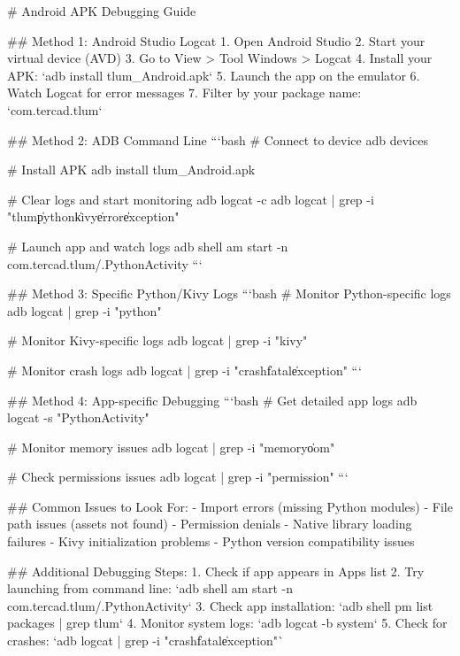 # Android APK Debugging Guide

## Method 1: Android Studio Logcat
1. Open Android Studio
2. Start your virtual device (AVD)
3. Go to View > Tool Windows > Logcat
4. Install your APK: `adb install tlum_Android.apk`
5. Launch the app on the emulator
6. Watch Logcat for error messages
7. Filter by your package name: `com.tercad.tlum`

## Method 2: ADB Command Line
```bash
# Connect to device
adb devices

# Install APK
adb install tlum_Android.apk

# Clear logs and start monitoring
adb logcat -c
adb logcat | grep -i "tlum\|python\|kivy\|error\|exception"

# Launch app and watch logs
adb shell am start -n com.tercad.tlum/.PythonActivity
```

## Method 3: Specific Python/Kivy Logs
```bash
# Monitor Python-specific logs
adb logcat | grep -i "python"

# Monitor Kivy-specific logs
adb logcat | grep -i "kivy"

# Monitor crash logs
adb logcat | grep -i "crash\|fatal\|exception"
```

## Method 4: App-specific Debugging
```bash
# Get detailed app logs
adb logcat -s "PythonActivity"

# Monitor memory issues
adb logcat | grep -i "memory\|oom"

# Check permissions issues
adb logcat | grep -i "permission"
```

## Common Issues to Look For:
- Import errors (missing Python modules)
- File path issues (assets not found)
- Permission denials
- Native library loading failures
- Kivy initialization problems
- Python version compatibility issues

## Additional Debugging Steps:
1. Check if app appears in Apps list
2. Try launching from command line: `adb shell am start -n com.tercad.tlum/.PythonActivity`
3. Check app installation: `adb shell pm list packages | grep tlum`
4. Monitor system logs: `adb logcat -b system`
5. Check for crashes: `adb logcat | grep -i "crash\|fatal\|exception"`
